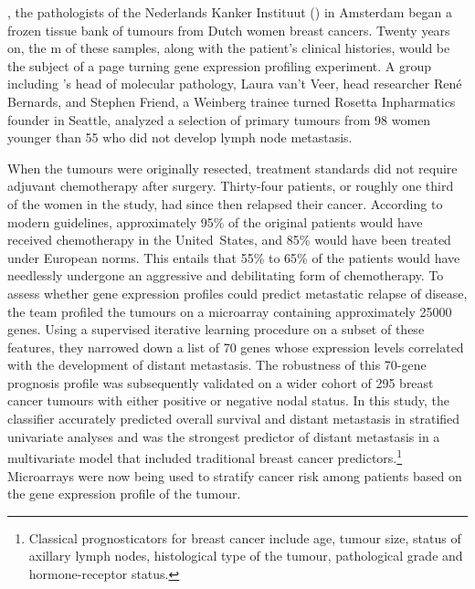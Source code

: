 
, the pathologists of the Nederlands Kanker
Instituut () in Amsterdam began a frozen tissue bank of tumours
from Dutch women breast cancers.  Twenty years on, the m of these
samples, along with the patient's clinical histories, would be the subject of a
page turning gene expression profiling experiment.  A group including
's head of molecular pathology, Laura van't Veer, head researcher
René Bernards, and Stephen Friend, a Weinberg trainee turned Rosetta
Inpharmatics founder in Seattle, analyzed a selection of primary tumours from 98
women younger than 55 who did not develop lymph node
metastasis.\cite{vant_veer_gene_2002}

When the tumours were originally resected, treatment standards did not require
adjuvant chemotherapy after surgery.  Thirty-four patients, or roughly one third
of the women in the study, had since then relapsed their cancer.  According to
modern guidelines, approximately 95\% of the original patients would have
received chemotherapy in the \mbox{United States}, and 85\% would have been
treated under European norms.  This entails that 55\% to 65\% of the patients
would have needlessly undergone an aggressive and debilitating form of
chemotherapy.  To assess whether gene expression profiles could predict
metastatic relapse of disease, the  team profiled the tumours on
a microarray containing approximately \num{25000} genes.  Using a supervised
iterative learning procedure on a subset of these features, they narrowed down a
list of 70 genes whose expression levels correlated with the development of
distant metastasis.  The robustness of this \mbox{70-gene} prognosis profile was
subsequently validated on a wider cohort of 295 breast cancer tumours with
either positive or negative nodal
status.\cite{van_de_vijver_gene-expression_2002} In this study, the classifier
accurately predicted overall survival and distant metastasis in stratified
univariate analyses and was the strongest predictor of distant metastasis in a
multivariate model that included traditional breast cancer
predictors.\footnote{Classical prognosticators for breast cancer include age,
  tumour size, status of axillary lymph nodes, histological type of the tumour,
  pathological grade and \mbox{hormone-receptor} status.}  Microarrays were now
being used to stratify cancer risk among patients based on the gene expression
profile of the tumour.

